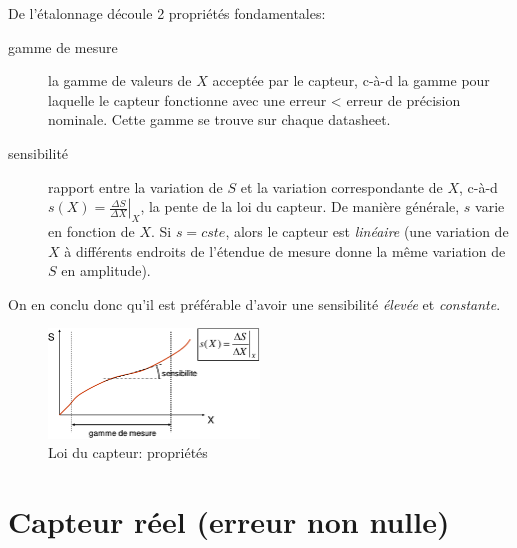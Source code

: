 De l'étalonnage découle 2 propriétés fondamentales:
\begin{description}
	\item[gamme de mesure] la gamme de valeurs de \(X\) acceptée par le capteur, c-à-d la gamme pour laquelle le capteur fonctionne avec une erreur < erreur de précision nominale. Cette gamme se trouve sur chaque datasheet.
	\item[sensibilité] rapport entre la variation de \(S\) et la variation correspondante de \(X\), c-à-d \(s(X)=\left.\frac{\Delta S}{\Delta X}\right|_X\), la pente de la loi du capteur. De manière générale, \(s\) varie en fonction de \(X\). Si \(s=cste\), alors le capteur est \emph{linéaire} (une variation de \(X\) à différents endroits de l'étendue de mesure donne la même variation de \(S\) en amplitude).
\end{description}
On en conclu donc qu'il est préférable d'avoir une sensibilité \emph{élevée} et \emph{constante}.
\begin{figure}[H] 
	\centering 
	\includegraphics[width=0.5\textwidth]{ch2/image3} 
	\caption{Loi du capteur: propriétés}
\end{figure}
\section{Capteur réel (erreur non nulle)}
